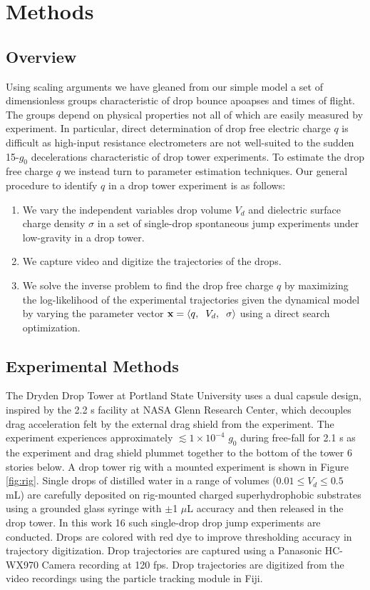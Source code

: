 \documentclass[aip,reprint, floatfix]{revtex4-1}
\begin{document}
\section{Methods}
\subsection{Overview}
Using scaling arguments we have gleaned from our simple model a set of dimensionless groups characteristic of drop bounce apoapses and times of flight. The groups depend on physical properties not all of which are easily measured by experiment. In particular, direct determination of drop free electric charge $q$ is difficult as high-input resistance electrometers are not well-suited to the sudden 15-$g_0$ decelerations characteristic of drop tower experiments. To estimate the drop free charge $q$ we instead turn to parameter estimation techniques. Our general procedure to identify $q$ in a drop tower experiment is as follows:
\begin{enumerate}
\item We vary the independent variables drop volume $V_d$ and dielectric surface charge density $\sigma$ in a set of single-drop spontaneous  jump experiments under low-gravity in a drop tower. 
\item We capture video and digitize the trajectories of the drops. 
\item We solve the inverse problem to find the drop free charge $q$ by maximizing the log-likelihood of the experimental trajectories given the dynamical model by varying the parameter vector $\mathbf{x} = \left\langle q, \hspace{2 mm} V_d, \hspace{2 mm} \sigma \right\rangle$ using a direct search optimization.                     
\end{enumerate}

\subsection{Experimental Methods}
The Dryden Drop Tower at Portland State University uses a dual capsule design, inspired by the 2.2 s facility at NASA Glenn Research Center, which decouples drag acceleration felt by the external drag shield from the experiment. The experiment experiences approximately $\lesssim 1 \times 10^{-4}$ $g_0$ during free-fall for 2.1 s as the experiment and drag shield plummet together to the bottom of the tower 6 stories below. A drop tower rig with a mounted experiment is shown in Figure \ref{fig:rig}. Single drops of distilled water in a range of volumes ($0.01 \leq V_d \leq 0.5$ mL) are carefully deposited on rig-mounted charged superhydrophobic substrates using a grounded glass syringe with $\pm $1 $\mu$L accuracy and then released in the drop tower. In this work 16 such single-drop drop jump experiments are conducted. Drops are colored with red dye to improve thresholding accuracy in trajectory digitization. Drop trajectories are captured using a Panasonic HC-WX970 Camera recording at 120 fps. Drop trajectories are digitized from the video recordings using the particle tracking module in Fiji. \cite{schindelin_fiji:_2012}
\end{document}
